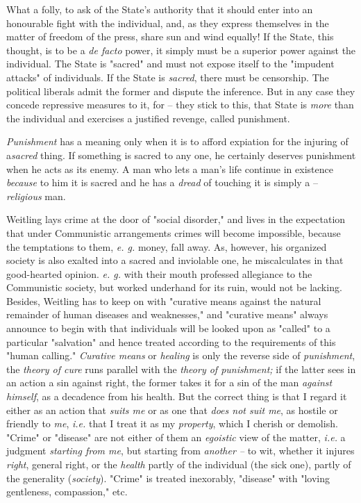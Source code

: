 What a folly, to ask of the State's authority that it should enter into an 
honourable fight with the individual, and, as they express themselves in the 
matter of freedom of the press, share sun and wind equally! If the State, this 
thought, is to be a \textit{de facto} power, it simply must be a superior 
power against the individual. The State is "{}sacred"{} and must not expose 
itself to the "{}impudent attacks"{} of individuals. If the State is 
\textit{sacred}, there must be censorship. The political liberals admit the 
former and dispute the inference. But in any case they concede repressive 
measures to it, for -- they stick to this, that State is \textit{more} than 
the individual and exercises a justified revenge, called punishment.

\textit{Punishment} has a meaning only when it is to afford expiation for the 
injuring of a\textit{sacred} thing. If something is sacred to any one, he 
certainly deserves punishment when he acts as its enemy. A man who lets a 
man's life continue in existence \textit{because} to him it is sacred and he 
has a \textit{dread} of touching it is simply a -- \textit{religious} man.

Weitling lays crime at the door of "{}social disorder,"{} and lives in the 
expectation that under Communistic arrangements crimes will become impossible, 
because the temptations to them, \textit{e. g.} money, fall away. As, however, 
his organized society is also exalted into a sacred and inviolable one, he 
miscalculates in that good-hearted opinion. \textit{e. g.} with their mouth 
professed allegiance to the Communistic society, but worked underhand for its 
ruin, would not be lacking. Besides, Weitling has to keep on with "{}curative 
means against the natural remainder of human diseases and weaknesses,"{} and 
"{}curative means"{} always announce to begin with that individuals will be 
looked upon as "{}called"{} to a particular "{}salvation"{} and hence treated 
according to the requirements of this "{}human calling."{} \textit{Curative 
means} or \textit{healing} is only the reverse side of \textit{punishment}, 
the \textit{theory of cure} runs parallel with the \textit{theory of 
punishment;} if the latter sees in an action a sin against right, the former 
takes it for a sin of the man \textit{against himself}, as a decadence from 
his health. But the correct thing is that I regard it either as an action that 
\textit{suits me} or as one that \textit{does not suit me}, as hostile or 
friendly to \textit{me}, \textit{i.e.} that I treat it as my 
\textit{property}, which I cherish or demolish. "{}Crime"{} or "{}disease"{} 
are not either of them an \textit{egoistic} view of the matter, \textit{i.e.} 
a judgment \textit{starting from me}, but starting from \textit{another --} to 
wit, whether it injures \textit{right}, general right, or the \textit{health} 
partly of the individual (the sick one), partly of the generality 
(\textit{society}). "{}Crime"{} is treated inexorably, "{}disease"{} with 
"{}loving gentleness, compassion,"{} etc.

